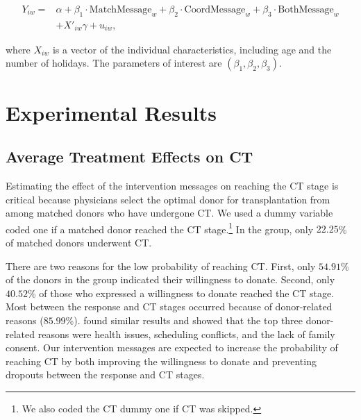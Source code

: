 \documentclass[12pt, a4paper]{article}
\newcommand{\revise}[1]{{\color{red}{#1}}}
\begin{document}
\begin{equation}
  \begin{split}
  Y_{iw} =& \alpha + \beta_1 \cdot \text{MatchMessage}_{w}
  + \beta_2 \cdot \text{CoordMessage}_{w} + \beta_3 \cdot \text{BothMessage}_{w} \\
  &+ X'_{iw} \gamma + u_{iw},
  \end{split}\label{eq:reg}
\end{equation}

\noindent
where \(X_{iw}\) is a vector of the individual characteristics, including age and the number of holidays. The parameters of interest are \((\beta_1, \beta_2, \beta_3)\). \revise{We used standard errors clustered by the assigned week for statistical inference because all donors who matched with the same patient might receive the letter in the same week.}

\hypertarget{result}{%
\section{Experimental Results}\label{result}}

\hypertarget{main}{%
\subsection{Average Treatment Effects on CT}\label{main}}

Estimating the effect of the intervention messages on reaching the CT stage is critical because physicians select the optimal donor for transplantation from among matched donors who have undergone CT. We used a dummy variable coded one if a matched donor reached the CT stage.\footnote{We also coded the CT dummy one if CT was skipped.} In the \revise{StatusQuo} group, only \(22.25\)\% of matched donors underwent CT.

There are two reasons for the low probability of reaching CT. First, only \(54.91\)\% of the donors in the \revise{StatusQuo} group indicated their willingness to donate. Second, only \(40.52\)\% of those who expressed a willingness to donate reached the CT stage. Most \revise{dropout} between the response and CT stages occurred because of donor-related reasons (\(85.99\)\%). \citet{Hirakawa2018} found similar results and showed that the top three donor-related reasons were health issues, scheduling conflicts, and the lack of family consent. Our intervention messages are expected to increase the probability of reaching CT by both improving the willingness to donate and preventing dropouts between the response and CT stages.
\end{document}
